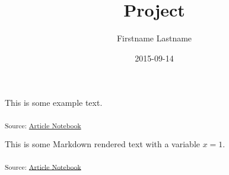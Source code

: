 \documentclass[
]{article}
\title{Project}
\author{Firstname Lastname}
\date{2015-09-14}
\begin{document}
\maketitle


This is some example text.

\textsubscript{Source:
\href{https://jacopok.github.io/quarto-template/index.qmd.html}{Article
Notebook}}

This is some Markdown rendered text with a variable \(x=1\).

\textsubscript{Source:
\href{https://jacopok.github.io/quarto-template/index.qmd.html}{Article
Notebook}}
\end{document}

